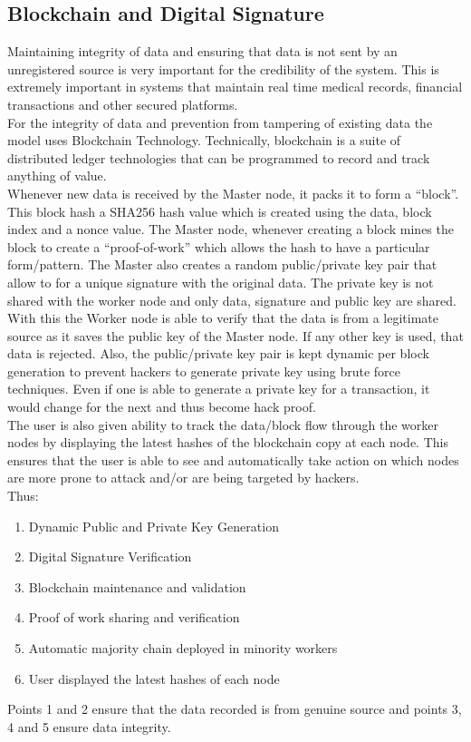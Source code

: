 \documentclass[AMA,STIX1COL]{WileyNJD-v2}
\begin{document}
\subsection{Blockchain and Digital Signature}
Maintaining integrity of data and ensuring that data is not sent by an unregistered source is very important for the credibility of the system. This is extremely important in systems that maintain real time medical records, financial transactions and other secured platforms. \\
For the integrity of data and prevention from tampering of existing data the model uses Blockchain Technology. Technically, blockchain is a suite of distributed ledger technologies that can be programmed to record and track anything of value. \\
Whenever new data is received by the Master node, it packs it to form a “block”. This block hash a SHA256 hash value which is created using the data, block index and a nonce value. The Master node, whenever creating a block mines the block to create a “proof-of-work” which allows the hash to have a particular form/pattern. The Master also creates a random public/private key pair that allow to for a unique signature with the original data. The private key is not shared with the worker node and only data, signature and public key are shared. With this the Worker node is able to verify that the data is from a legitimate source as it saves the public key of the Master node. If any other key is used, that data is rejected. Also, the public/private key pair is kept dynamic per block generation to prevent hackers to generate private key using brute force techniques. Even if one is able to generate a private key for a transaction, it would change for the next and thus become hack proof. \\
The user is also given ability to track the data/block flow through the worker nodes by displaying the latest hashes of the blockchain copy at each node. This ensures that the user is able to see and automatically take action on which nodes are more prone to attack and/or are being targeted by hackers.\\
Thus:
\begin{enumerate}
\item Dynamic Public and Private Key Generation
\item Digital Signature Verification
\item Blockchain maintenance and validation
\item Proof of work sharing and verification
\item Automatic majority chain deployed in minority workers
\item User displayed the latest hashes of each node
\end{enumerate}
Points 1 and 2 ensure that the data recorded is from genuine source and points 3, 4 and 5 ensure data integrity.
\end{document}
